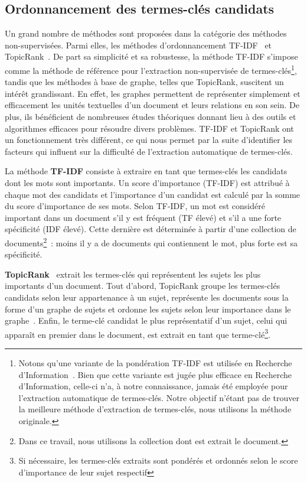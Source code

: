   \subsection{Ordonnancement des termes-clés candidats}
  \label{subsec:extraction_de_termes_cles}
    Un grand nombre de méthodes sont proposées dans la catégorie des méthodes
    non-supervisées. Parmi elles, les méthodes d'ordonnancement
    TF-IDF~\cite{jones1972tfidf} et TopicRank~\cite{bougouin2013topicrank}. De
    part sa simplicité et sa robustesse, la méthode TF-IDF s'impose comme la
    méthode de référence pour l'extraction non-supervisée de
    termes-clés\footnote{Notons qu'une variante de la pondération TF-IDF est
    utilisée en Recherche
    d'Information~\cite[Okapi]{robertson1999okapi,claveau2012vectorisation}.
    Bien que cette variante est jugée plus efficace en Recherche d'Information,
    celle-ci n'a, à notre connaissance, jamais été employée pour l'extraction
    automatique de termes-clés. Notre objectif n'étant pas de trouver la
    meilleure méthode d'extraction de termes-clés, nous utilisons la méthode
    originale.}, tandis que les méthodes à base de graphe, telles que TopicRank,
    suscitent un intérêt grandissant. En effet, les graphes permettent de
    représenter simplement et efficacement les unités textuelles d'un document
    et leurs relations en son sein. De plus, ils bénéficient de nombreuses
    études théoriques donnant lieu à des outils et algorithmes efficaces pour
    résoudre divers problèmes. TF-IDF et TopicRank ont un fonctionnement très
    différent, ce qui nous permet par la suite d'identifier les
    facteurs qui influent sur la difficulté de l'extraction automatique de
    termes-clés.

    La méthode \textbf{TF-IDF} consiste à extraire en tant que termes-clés les
    candidats dont les mots sont importants. Un score d'importance (TF-IDF) est
    attribué à chaque mot des candidats et l'importance d'un candidat est
    calculé par la somme du score d'importance de ses mots. Selon TF-IDF, un mot
    est considéré important dans un document s'il y est fréquent (TF élevé) et
    s'il a une forte spécificité (IDF élevé). Cette dernière est déterminée à
    partir d'une collection de documents\footnote{Dans ce travail, nous
    utilisons la collection dont est extrait le document.}~: moins il y a de
    documents qui contiennent le mot, plus forte est sa spécificité.

    \textbf{TopicRank}~\cite{bougouin2013topicrank} extrait les termes-clés qui
    représentent les sujets les plus importants d'un document. Tout d'abord,
    TopicRank groupe les termes-clés candidats selon leur appartenance à un
    sujet, représente les documents sous la forme d'un graphe de sujets et
    ordonne les sujets selon leur importance dans le
    graphe~\cite{mihalcea2004textrank}. Enfin, le terme-clé candidat le plus
    représentatif d'un sujet, celui qui apparaît en premier dans le document,
    est extrait en tant que terme-clé\footnote{Si nécessaire, les termes-clés
    extraits sont pondérés et ordonnés selon le score d'importance de leur sujet
    respectif}.
    
